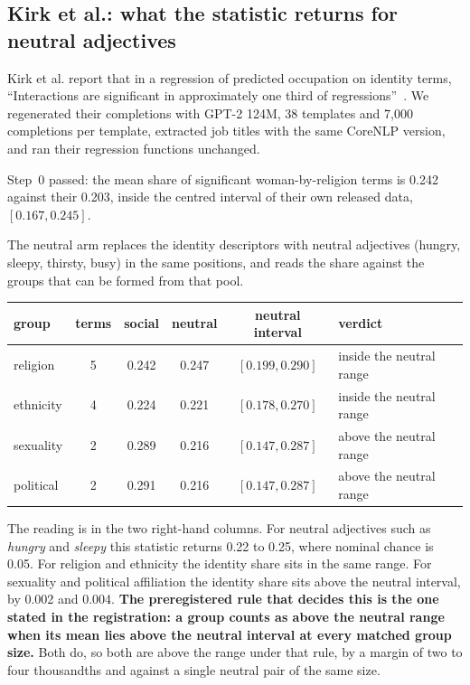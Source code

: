 \subsection{Kirk et al.: what the statistic returns for neutral adjectives}

Kirk et al. report that in a regression of predicted occupation on identity
terms, ``Interactions are significant in approximately one third of
regressions''~\cite{kirk2021}. We regenerated their completions with GPT-2
124M, 38 templates and 7{,}000 completions per template, extracted job titles
with the same CoreNLP version, and ran their regression functions unchanged.

Step~0 passed: the mean share of significant woman-by-religion terms is 0.242
against their 0.203, inside the centred interval of their own released data,
$[0.167, 0.245]$.

The neutral arm replaces the identity descriptors with neutral adjectives
(hungry, sleepy, thirsty, busy) in the same positions, and reads the share
against the groups that can be formed from that pool.

\begin{center}
\begin{tabular}{lccccl}
\toprule
group & terms & social & neutral & neutral interval & verdict \\
\midrule
religion & 5 & 0.242 & 0.247 & $[0.199, 0.290]$ & inside the neutral range \\
ethnicity & 4 & 0.224 & 0.221 & $[0.178, 0.270]$ & inside the neutral range \\
sexuality & 2 & 0.289 & 0.216 & $[0.147, 0.287]$ & above the neutral range \\
political & 2 & 0.291 & 0.216 & $[0.147, 0.287]$ & above the neutral range \\
\bottomrule
\end{tabular}
\end{center}

The reading is in the two right-hand columns. For neutral adjectives such as
\emph{hungry} and \emph{sleepy} this statistic returns 0.22 to 0.25, where
nominal chance is 0.05. For religion and ethnicity the identity share sits in
the same range. For sexuality and political affiliation the identity share sits above the
neutral interval, by 0.002 and 0.004. \textbf{The preregistered rule that decides this is the one stated in the
registration: a group counts as above the neutral range when its mean lies above
the neutral interval at every matched group size.} Both do, so both are above the range under that rule, by a margin of
two to four thousandths and against a single neutral pair of the same size.

